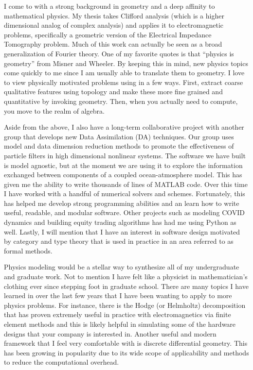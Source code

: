 \documentclass[12pt, letter]{awesome-cv}
\begin{document}
\makecvheader
\makelettertitle
\begin{cvletter}



I come to with a strong background in geometry and a deep affinity to mathematical physics. My thesis takes Clifford analysis (which is a higher dimensional analog of complex analysis) and applies it to electromagnetic problems, specifically a geometric version of the Electrical Impedance Tomography problem. Much of this work can actually be seen as a broad generalization of Fourier theory. One of my favorite quotes is that ``physics is geometry'' from Misner and Wheeler. By keeping this in mind, new physics topics come quickly to me since I am usually able to translate them to geometry. I love to view physically motivated problems using in a few ways. First, extract coarse qualitative features using topology and make these more fine grained and quantitative by invoking geometry. Then, when you actually need to compute, you move to the realm of algebra. 

Aside from the above, I also have a long-term collaborative project with another group that develops new Data Assimilation (DA) techniques. Our group uses model and data dimension reduction methods to promote the effectiveness of particle filters in high dimensional nonlinear systems. The software we have built is model agnostic, but at the moment we are using it to explore the information exchanged between components of a coupled ocean-atmosphere model. This has given me the ability to write thousands of lines of MATLAB code. Over this time I have worked with a handful of numerical solvers and schemes. Fortunately, this has helped me develop strong programming abilities and an learn how to write useful, readable, and modular software. Other projects such as modeling COVID dynamics and building equity trading algorithms has had me using Python as well. Lastly, I will mention that I have an interest in software design motivated by category and type theory that is used in practice in an area referred to as formal methods.

Physics modeling would be a stellar way to synthesize all of my undergraduate and graduate work. Not to mention I have felt like a physicist in mathematician's clothing ever since stepping foot in graduate school. There are many topics I have learned in over the last few years that I have been wanting to apply to more physics problems. For instance, there is the Hodge (or Helmholtz) decomposition that has proven extremely useful in practice with electromagnetics via finite element methods and this is likely helpful in simulating some of the hardware designs that your company is interested in. Another useful and modern framework that I feel very comfortable with is discrete differential geometry. This has been growing in popularity due to its wide scope of applicability and methods to reduce the computational overhead.


\end{cvletter}
\end{document}
